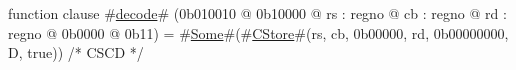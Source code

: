 function clause #\hyperref[zdecode]{decode}# (0b010010 @ 0b10000 @ rs : regno @ cb : regno @ rd : regno @ 0b0000 @ 0b11) = #\hyperref[zSome]{Some}#(#\hyperref[zCStore]{CStore}#(rs, cb, 0b00000, rd, 0b00000000, D, true)) /* CSCD */
